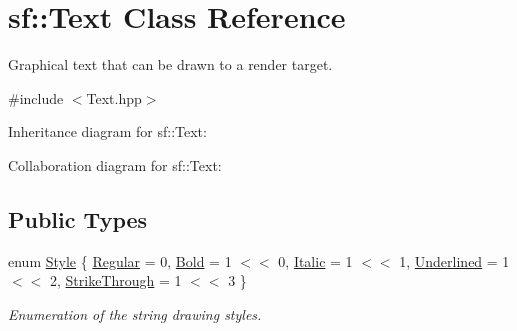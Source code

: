 \hypertarget{classsf_1_1_text}{}\section{sf\+:\+:Text Class Reference}
\label{classsf_1_1_text}


Graphical text that can be drawn to a render target.  




{\ttfamily \#include $<$Text.\+hpp$>$}



Inheritance diagram for sf\+:\+:Text\+:


Collaboration diagram for sf\+:\+:Text\+:
\subsection*{Public Types}
\begin{DoxyCompactItemize}
\item 
enum \hyperlink{classsf_1_1_text_aa8add4aef484c6e6b20faff07452bd82}{Style} \{ \newline
\hyperlink{classsf_1_1_text_aa8add4aef484c6e6b20faff07452bd82a2af9ae5e1cda126570f744448e0caa32}{Regular} = 0, 
\hyperlink{classsf_1_1_text_aa8add4aef484c6e6b20faff07452bd82af1b47f98fb1e10509ba930a596987171}{Bold} = 1 $<$$<$ 0, 
\hyperlink{classsf_1_1_text_aa8add4aef484c6e6b20faff07452bd82aee249eb803848723c542c2062ebe69d8}{Italic} = 1 $<$$<$ 1, 
\hyperlink{classsf_1_1_text_aa8add4aef484c6e6b20faff07452bd82a664bd143f92b6e8c709d7f788e8b20df}{Underlined} = 1 $<$$<$ 2, 
\newline
\hyperlink{classsf_1_1_text_aa8add4aef484c6e6b20faff07452bd82a9ed1f5bb154c21269e1190c5aa97d479}{Strike\+Through} = 1 $<$$<$ 3
 \}\begin{DoxyCompactList}\small\item\em Enumeration of the string drawing styles. \end{DoxyCompactList}
\end{DoxyCompactItemize}
